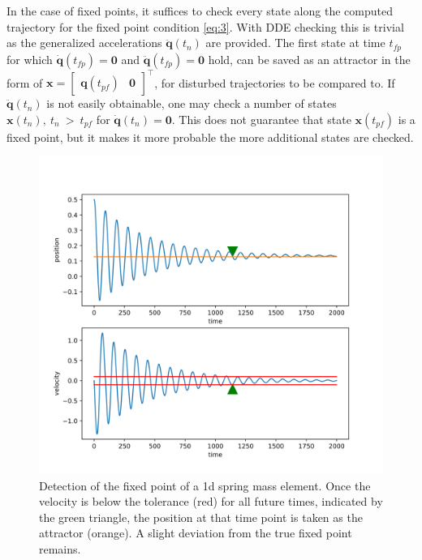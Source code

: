 In the case of fixed points, it suffices to check every state along the computed trajectory for the fixed point condition \ref{eq:3}. With DDE checking this is trivial as the generalized accelerations $\ddot{\mathbf{q}}(t_n)$ are provided. 
The first state at time $t_{fp}$ for which $\dot{\mathbf{q}}(t_{fp}) = \mathbf{0}$ and $\ddot{\mathbf{q}}(t_{fp}) = \mathbf{0}$ hold, can be saved as an attractor in the form of $\mathbf{x} = \begin{bmatrix}\mathbf{q}(t_{pf})&\mathbf{0}\end{bmatrix}^\intercal$, for disturbed trajectories to be compared to. 
If $\ddot{\mathbf{q}}(t_n)$ is not easily obtainable, one may check a number of states $\mathbf{x}(t_n),\ t_n\ >\ t_{pf}$ for $\dot{\mathbf{q}}(t_n) = \mathbf{0}$. This does not guarantee that state $\mathbf{x}(t_{pf})$ is a fixed point, 
but it makes it more probable the more additional states are checked. 

\begin{figure}[h]
\centering
\includegraphics[width=.7\textwidth]{figures/fixed_point_detection.png}
\caption[Fixed Point Detection]{Detection of the fixed point of a 1d spring mass element. Once the velocity is below the tolerance (red) for all future times, indicated by the green triangle, the position at that time point is taken as the attractor (orange). A slight deviation from the true fixed point remains.}
\label{fpdet}
\end{figure}

